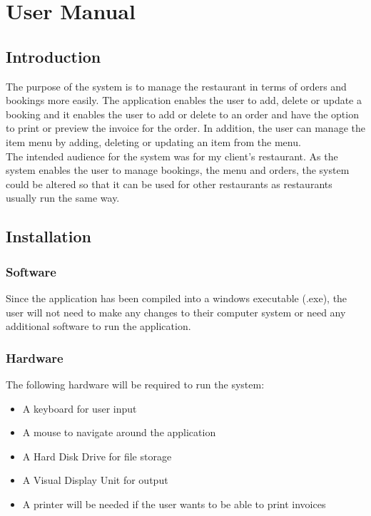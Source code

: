 
\chapter{User Manual}


\section{Introduction}
The purpose of the system is to manage the restaurant in terms of orders and bookings more easily. The application enables the user to add, delete or update a booking and it enables the user to add or delete to an order and have the option to print or preview the invoice for the order. In addition, the user can manage the item menu by adding, deleting or updating an item from the menu. \\

The intended audience for the system was for my client's restaurant. As the system enables the user to manage bookings, the menu and orders, the system could be altered so that it can be used for other restaurants as restaurants usually run the same way.

\section{Installation}

\subsection{Software}
Since the application has been compiled into a windows executable (.exe), the user will not need to make any changes to their computer system or need any additional software to run the application.

\subsection{Hardware}

The following hardware will be required to run the system:

\begin{itemize}

	\item A keyboard for user input
	\item A mouse to navigate around the application
	\item A Hard Disk Drive for file storage 
	\item A Visual Display Unit for output
	\item A printer will be needed if the user wants to be able to print invoices
	

\end{itemize}

